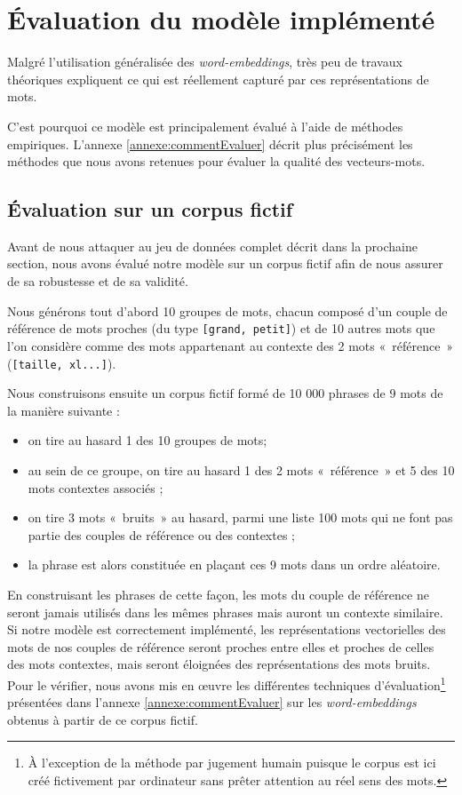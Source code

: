 \documentclass[11pt,french,french]{article}
\providecommand{\tightlist}{%
  \setlength{\parskip}{0pt}
  }
\let\rmarkdownfootnote\footnote%
\def\footnote{\protect\rmarkdownfootnote}
\begin{document}
\section{Évaluation du modèle implémenté}\label{sec:evaluation}

Malgré l'utilisation généralisée des \emph{word-embeddings}, très peu de
travaux théoriques expliquent ce qui est réellement capturé par ces
représentations de mots.

C'est pourquoi ce modèle est principalement évalué à l'aide de méthodes
empiriques. L'annexe \ref{annexe:commentEvaluer} décrit plus précisément
les méthodes que nous avons retenues pour évaluer la qualité des
vecteurs-mots.

\subsection{Évaluation sur un corpus fictif}\label{sec:corpusFictif}

Avant de nous attaquer au jeu de données complet décrit dans la
prochaine section, nous avons évalué notre modèle sur un corpus fictif
afin de nous assurer de sa robustesse et de sa validité.

Nous générons tout d'abord 10 groupes de mots, chacun composé d'un
couple de référence de mots proches (du type
\texttt{{[}grand,\ petit{]}}) et de 10 autres mots que l'on considère
comme des mots appartenant au contexte des 2 mots «~référence~»
(\texttt{{[}taille,\ xl...{]}}).

Nous construisons ensuite un corpus fictif formé de 10 000 phrases de 9
mots de la manière suivante :

\begin{itemize}
\tightlist
\item
  on tire au hasard 1 des 10 groupes de mots;
\item
  au sein de ce groupe, on tire au hasard 1 des 2 mots «~référence~» et
  5 des 10 mots contextes associés ;
\item
  on tire 3 mots «~bruits~» au hasard, parmi une liste 100 mots qui ne
  font pas partie des couples de référence ou des contextes ;
\item
  la phrase est alors constituée en plaçant ces 9 mots dans un ordre
  aléatoire.
\end{itemize}

En construisant les phrases de cette façon, les mots du couple de
référence ne seront jamais utilisés dans les mêmes phrases mais auront
un contexte similaire. Si notre modèle est correctement implémenté, les
représentations vectorielles des mots de nos couples de référence seront
proches entre elles et proches de celles des mots contextes, mais seront
éloignées des représentations des mots bruits. Pour le vérifier, nous
avons mis en œuvre les différentes techniques d'évaluation\footnote{À
  l'exception de la méthode par \og jugement humain \fg{} puisque le
  corpus est ici créé fictivement par ordinateur sans prêter attention
  au réel sens des mots.} présentées dans l'annexe
\ref{annexe:commentEvaluer} sur les \emph{word-embeddings} obtenus à
partir de ce corpus fictif.
\end{document}
